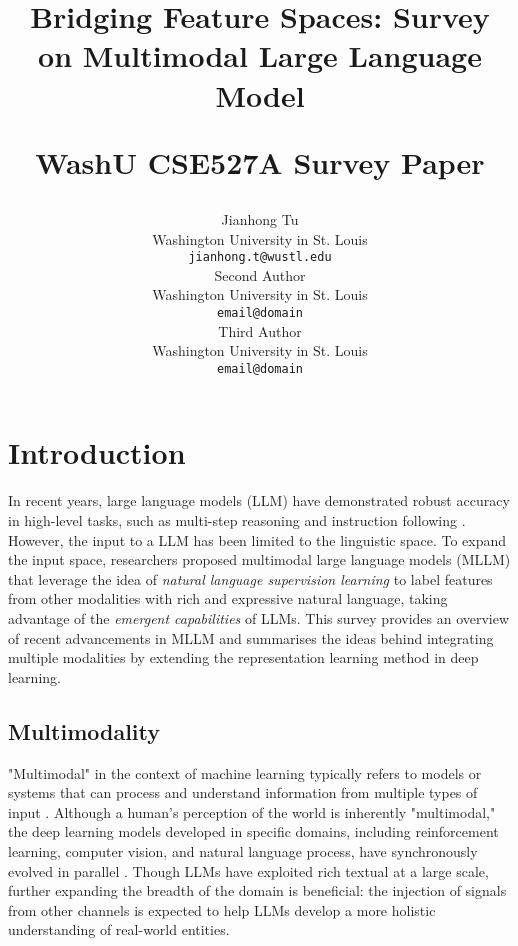 \documentclass[11pt]{article}
\title{Bridging Feature Spaces: Survey on Multimodal Large Language Model



 \vspace{1em}
  \small{\normalfont WashU CSE527A Survey Paper} }
\author{Jianhong Tu \\
  Washington University in St. Louis \\
  \texttt{jianhong.t@wustl.edu} \\\And
  Second Author \\
  Washington University in St. Louis \\
  \texttt{email@domain} \\\AND
  Third Author \\
  Washington University in St. Louis \\
  \texttt{email@domain} \\}
\begin{document}
\maketitle

\begin{abstract}

\end{abstract}

\section{Introduction}
In recent years, large language models (LLM) have demonstrated robust accuracy in high-level tasks, such as multi-step reasoning \citep{DBLP:journals/corr/abs-2112-11446} and instruction following \citep{DBLP:conf/nips/Ouyang0JAWMZASR22}. However, the input to a LLM has been limited to the linguistic space. To expand the input space, researchers proposed multimodal large language models (MLLM) that leverage the idea of \textit{natural language supervision learning} \citep{DBLP:conf/icml/RadfordKHRGASAM21} to label features from other modalities with rich and expressive natural language, taking advantage of the \textit{emergent capabilities} \citep{DBLP:journals/tmlr/WeiTBRZBYBZMCHVLDF22} of LLMs. This survey provides an overview of recent advancements in MLLM and summarises the ideas behind integrating multiple modalities by extending the representation learning method in deep learning.

\subsection{Multimodality}
"Multimodal" in the context of machine learning typically refers to models or systems that can process and understand information from multiple types of input \citep{kress2009multimodality}. Although a human's perception of the world is inherently "multimodal," the deep learning models developed in specific domains, including reinforcement learning, computer vision, and natural language process, have synchronously evolved in parallel \citep{DBLP:journals/corr/abs-2306-13549}. Though LLMs have exploited 
rich textual at a large scale, further expanding the breadth of the domain is beneficial: the injection of signals from other channels is expected to help LLMs develop a more holistic understanding of real-world entities.
\end{document}
